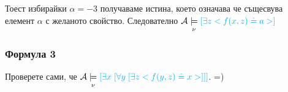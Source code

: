 \documentclass{article}[12pt]
\begin{document}
Тоест избирайки \(\alpha = -3\) получаваме истина, което означава че същесвува елемент \(\alpha\) с желаното свойство.
Следователно \(\mathcal{A} \underset{\nu}{\models} \color{cyan} [ \exists z < f(x, z) \doteq a > ]\)

\subsubsection{Формула 3}
Проверете сами, че \(\mathcal{A} \underset{\nu}{\models} \color{cyan} [\exists x \; [ \forall y \; [ \exists z < f(y, z) \doteq x >] ]]\).  =)
\end{document}
